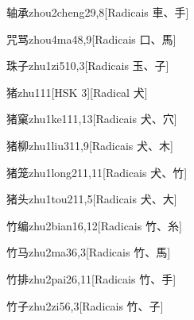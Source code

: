 \begin{entry}{轴承}{zhou2cheng2}{9,8}[Radicais ⾞、⼿]
\end{entry}

\begin{entry}{咒骂}{zhou4ma4}{8,9}[Radicais ⼝、⾺]
\end{entry}

\begin{entry}{珠子}{zhu1zi5}{10,3}[Radicais ⽟、⼦]
\end{entry}

\begin{entry}{猪}{zhu1}{11}[HSK 3][Radical ⽝]
\end{entry}

\begin{entry}{猪窠}{zhu1ke1}{11,13}[Radicais ⽝、⽳]
\end{entry}

\begin{entry}{猪柳}{zhu1liu3}{11,9}[Radicais ⽝、⽊]
\end{entry}

\begin{entry}{猪笼}{zhu1long2}{11,11}[Radicais ⽝、⽵]
\end{entry}

\begin{entry}{猪头}{zhu1tou2}{11,5}[Radicais ⽝、⼤]
\end{entry}

\begin{entry}{竹编}{zhu2bian1}{6,12}[Radicais ⽵、⽷]
\end{entry}

\begin{entry}{竹马}{zhu2ma3}{6,3}[Radicais ⽵、⾺]
\end{entry}

\begin{entry}{竹排}{zhu2pai2}{6,11}[Radicais ⽵、⼿]
\end{entry}

\begin{entry}{竹子}{zhu2zi5}{6,3}[Radicais ⽵、⼦]
\end{entry}

